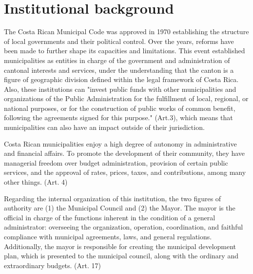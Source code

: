 \section{Institutional background}\label{sec:institution_background}

The Costa Rican Municipal Code was approved in 1970 establishing the structure of local governments and their political control. Over the years, reforms have been made to further shape its capacities and limitations. \parencite[p. 10]{alfaro2009} This event established municipalities as entities in charge of the government and administration of cantonal interests and services, under the understanding that the canton is a figure of geographic division defined within the legal framework of Costa Rica. \parencite[Art. 3]{al1998} Also, these institutions can "invest public funds with other municipalities and organizations of the Public Administration for the fulfillment of local, regional, or national purposes, or for the construction of public works of common benefit, following the agreements signed for this purpose." (Art.3), which means that municipalities can also have an impact outside of their jurisdiction. 

Costa Rican municipalities enjoy a high degree of autonomy in administrative and financial affairs. To promote the development of their community, they have managerial freedom over budget administration, provision of certain public services, and the approval of rates, prices, taxes, and contributions, among many other things. (Art. 4) 

Regarding the internal organization of this institution, the two figures of authority are (1) the Municipal Council and (2) the Mayor. The mayor is the official in charge of the functions inherent in the condition of a general administrator: overseeing the organization, operation, coordination, and faithful compliance with municipal agreements, laws, and general regulations. Additionally, the mayor is responsible for creating the municipal development plan, which is presented to the municipal council, along with the ordinary and extraordinary budgets. (Art. 17)


